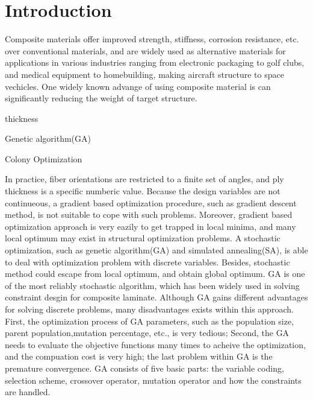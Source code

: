 \section{Introduction}
Composite materials offer improved strength, stiffness, corrosion resistance, etc. over conventional
materials, and are widely used as alternative materials for applications in various industries
ranging from electronic packaging to golf clubs, and medical equipment to homebuilding, making
aircraft structure to space vechicles. One widely known advange of using composite material is can
significantly reducing the weight of target structure.  


thickness\cite { schmit1973optimum, schmit1977optimum, fukunaga1991strength, soares1995discrete,
	le1995improved, jayatheertha1996application, wang1996optimum, adali1997minimum,
	correia1997higher, scares1997optimization, abu1998optimum, lombardi1998anti, le1998design,
	sivakumar1998optimum, barakat1999use, richard2000reliability, moita2000sensitivity,
soremekun2001composite, walker2003technique, di2003multiconstrained, kere2003using}



Genetic
algorithm(GA)\cite{callahan1992optimum,soremekun2001composite,park2001stacking,walker2003technique,deka2005multiobjective,pelletier2006multi,jadhav2007parametric,kim2007development,park2008improved,}

Colony Optimization\cite{aymerich2006ant,}



In practice, fiber orientations are restricted to a finite set of angles, and ply thickness is a
specific numberic value.  Because the design variables are not continueous, a gradient based
optimization procedure, such as gradient descent method, is not suitable to cope with such problems.
Moreover, gradient based optimization approach is very eazily to get trapped in local minima, and
many local optimum may exist in structural optimization problems. A stochastic optimization, such as
genetic algorithm(GA) and simulated annealing(SA), is able to deal with optimization problem with
discrete variables. Besides, stochastic method could escape from local optimum, and obtain global
optimum.  GA is one of the most reliably stochastic algorithm, which has been widely used in solving
constraint desgin for composite laminate. Although GA gains different advantages for solving
discrete problems, many disadvantages exists within this approach. First, the optimization process
of GA parameters, such as the population size, parent population,mutation percentage, etc., is very
tedious; Second, the GA needs to evaluate the objective functions many times to acheive the
optimization, and the compuation cost is very high; the last problem within GA is the premature
convergence. GA consists of five basic parts: the variable coding, selection scheme, crossover
operator, mutation operator and how the constraints are handled.

